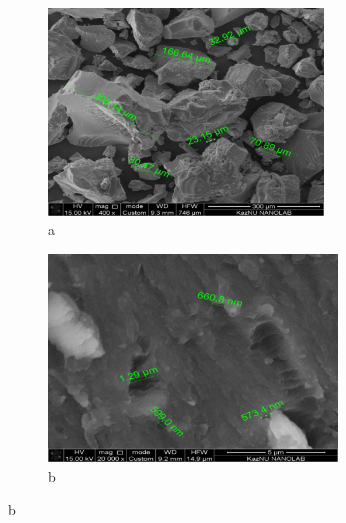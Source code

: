 \begin{figure}[H]
    \centering
    \begin{subfigure}[t]{0.45\textwidth}
        \centering
        \includegraphics[height=5.5cm]{media/chem2/image93}
        \caption*{a}
    \end{subfigure}
    \begin{subfigure}[t]{0.45\textwidth}
        \centering
        \includegraphics[height=5.5cm]{media/chem2/image94}
        \caption*{b}
    \end{subfigure}
    

\end{figure}
